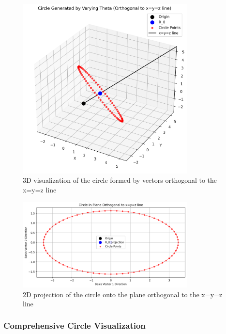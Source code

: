 \begin{figure}[H]
    \centering
    \includegraphics[width=0.8\textwidth]{figures/orthogonality_test/orthogonality_circle_3d.png}
    \caption{3D visualization of the circle formed by vectors orthogonal to the x=y=z line}
    \label{fig:orthogonality_circle_3d}
\end{figure}

\begin{figure}[H]
    \centering
    \includegraphics[width=0.8\textwidth]{figures/orthogonality_test/orthogonality_circle_2d.png}
    \caption{2D projection of the circle onto the plane orthogonal to the x=y=z line}
    \label{fig:orthogonality_circle_2d}
\end{figure}

\subsubsection{Comprehensive Circle Visualization}

